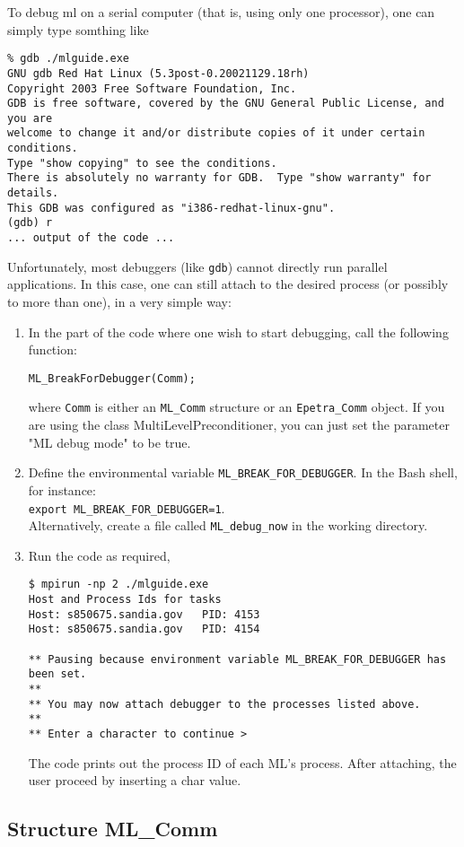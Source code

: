 \documentclass[10pt,letter,relax]{SANDreport}
\newcommand{\ML}     {{\sc ml }}
\begin{document}
To debug \ML on a serial computer (that is, using only one processor),
one can simply type somthing like
\begin{verbatim}
% gdb ./mlguide.exe
GNU gdb Red Hat Linux (5.3post-0.20021129.18rh)
Copyright 2003 Free Software Foundation, Inc.
GDB is free software, covered by the GNU General Public License, and you are
welcome to change it and/or distribute copies of it under certain conditions.
Type "show copying" to see the conditions.
There is absolutely no warranty for GDB.  Type "show warranty" for details.
This GDB was configured as "i386-redhat-linux-gnu".
(gdb) r
... output of the code ...
\end{verbatim}
Unfortunately, most debuggers (like \verb!gdb!) cannot directly run
parallel applications. In this case, one can still attach to the desired
process (or possibly to more than one), in a very simple way:
\begin{enumerate}
\item In the part of the code where one wish to start debugging, call
  the following function:
\begin{verbatim}
ML_BreakForDebugger(Comm);
\end{verbatim}
where \verb!Comm! is either an \verb!ML_Comm! structure or an \verb!Epetra_Comm!
object.
If you are using the class MultiLevelPreconditioner, you can just set the
parameter "ML debug mode" to be true.
\item Define the environmental variable \verb!ML_BREAK_FOR_DEBUGGER!.
  In the Bash shell, for instance:\\
{\tt export ML\_BREAK\_FOR\_DEBUGGER=1}.\\
Alternatively, create a file
called \verb!ML_debug_now! in the working directory.
\item Run the code as required,
\begin{verbatim}
$ mpirun -np 2 ./mlguide.exe
Host and Process Ids for tasks
Host: s850675.sandia.gov   PID: 4153
Host: s850675.sandia.gov   PID: 4154

** Pausing because environment variable ML_BREAK_FOR_DEBUGGER has been set.
**
** You may now attach debugger to the processes listed above.
**
** Enter a character to continue >
\end{verbatim}
The code prints out the process ID of each ML's process. After
attaching, the user proceed by inserting a char value.
\end{enumerate}


\subsection{Structure ML\_Comm}
\end{document}
